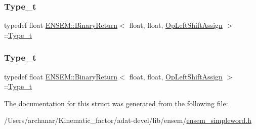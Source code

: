 \mbox{\label{structENSEM_1_1BinaryReturn_3_01float_00_01float_00_01OpLeftShiftAssign_01_4_a5a606c4c7a70df274b8a186efebfd11e}} 
\subsubsection{\texorpdfstring{Type\_t}{Type\_t}\hspace{0.1cm}{\footnotesize\ttfamily [2/3]}}
{\footnotesize\ttfamily typedef float \mbox{\hyperlink{structENSEM_1_1BinaryReturn}{E\+N\+S\+E\+M\+::\+Binary\+Return}}$<$ float, float, \mbox{\hyperlink{structENSEM_1_1OpLeftShiftAssign}{Op\+Left\+Shift\+Assign}} $>$\+::\mbox{\hyperlink{structENSEM_1_1BinaryReturn_3_01float_00_01float_00_01OpLeftShiftAssign_01_4_a5a606c4c7a70df274b8a186efebfd11e}{Type\+\_\+t}}}

\mbox{\label{structENSEM_1_1BinaryReturn_3_01float_00_01float_00_01OpLeftShiftAssign_01_4_a5a606c4c7a70df274b8a186efebfd11e}} 
\subsubsection{\texorpdfstring{Type\_t}{Type\_t}\hspace{0.1cm}{\footnotesize\ttfamily [3/3]}}
{\footnotesize\ttfamily typedef float \mbox{\hyperlink{structENSEM_1_1BinaryReturn}{E\+N\+S\+E\+M\+::\+Binary\+Return}}$<$ float, float, \mbox{\hyperlink{structENSEM_1_1OpLeftShiftAssign}{Op\+Left\+Shift\+Assign}} $>$\+::\mbox{\hyperlink{structENSEM_1_1BinaryReturn_3_01float_00_01float_00_01OpLeftShiftAssign_01_4_a5a606c4c7a70df274b8a186efebfd11e}{Type\+\_\+t}}}



The documentation for this struct was generated from the following file\+:\begin{DoxyCompactItemize}
\item 
/\+Users/archanar/\+Kinematic\+\_\+factor/adat-\/devel/lib/ensem/\mbox{\hyperlink{adat-devel_2lib_2ensem_2ensem__simpleword_8h}{ensem\+\_\+simpleword.\+h}}\end{DoxyCompactItemize}
